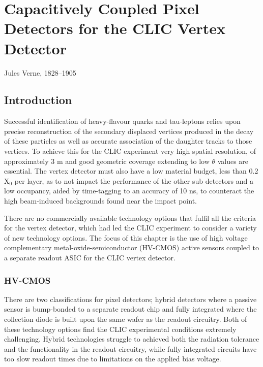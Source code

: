 \chapter{Capacitively Coupled Pixel Detectors for the CLIC Vertex Detector}
\label{chap:theory}

{Jules Verne, 1828--1905}

\section{Introduction}
Successful identification of heavy-flavour quarks and tau-leptons relies upon precise reconstruction of the secondary displaced vertices produced in the decay of these particles as well as accurate association of the daughter tracks to those vertices.  To achieve this for the CLIC experiment very high spatial resolution, of approximately 3 {\mu}m and good geometric coverage extending to low $\theta$ values are essential.  The vertex detector must also have a low material budget, less than 0.2 $\text{X}_{0}$ per layer, as to not impact the performance of the other sub detectors and a low occupancy, aided by time-tagging to an accuracy of 10 ns, to counteract the high beam-induced backgrounds found near the impact point.  

There are no commercially available technology options that fulfil all the criteria for the vertex detector, which had led the CLIC experiment to consider a variety of new technology options.  The focus of this chapter is the use of high voltage complementary metal-oxide-semiconductor (HV-CMOS) active sensors coupled to a separate readout ASIC for the CLIC vertex detector.  


\subsection{HV-CMOS}
There are two classifications for pixel detectors; hybrid detectors where a passive sensor is bump-bonded to a separate readout chip and fully integrated where the collection diode is built upon the same wafer as the readout circuitry.  Both of these technology options find the CLIC experimental conditions extremely challenging.  Hybrid technologies struggle to achieved both the radiation tolerance and the functionality in the readout circuitry, while fully integrated circuits have too slow readout times due to limitations on the applied bias voltage.  

